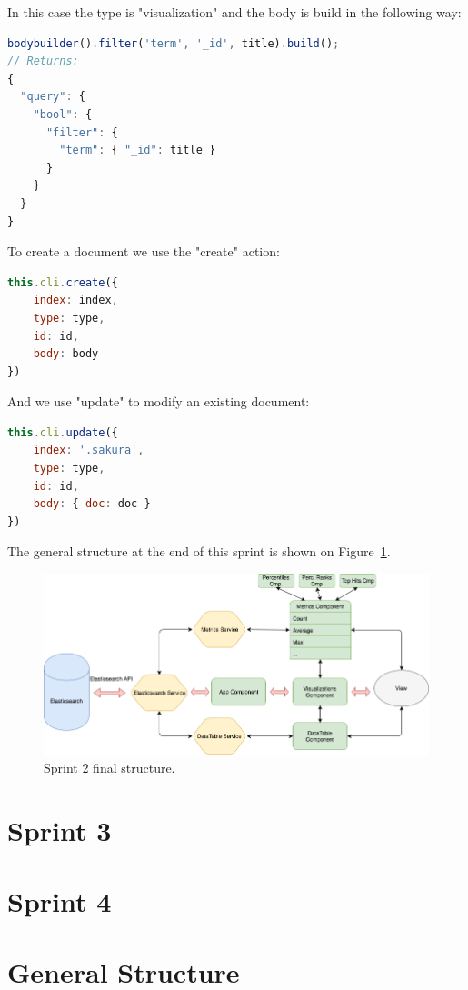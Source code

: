 \documentclass[a4paper, 12pt, english]{book}
\begin{document}
In this case the type is "visualization" and the body is build in the following way:
\begin{lstlisting}[language=javascript]
bodybuilder().filter('term', '_id', title).build();
// Returns:
{
  "query": {
    "bool": {
      "filter": {
        "term": { "_id": title }
      }
    }
  }
}
\end{lstlisting}

To create a document we use the "create" action:
\begin{lstlisting}[language=javascript]
this.cli.create({
	index: index,
	type: type,
	id: id,
	body: body
})
\end{lstlisting}

And we use "update" to modify an existing document:
\begin{lstlisting}[language=javascript]
this.cli.update({
	index: '.sakura',
	type: type,
	id: id,
	body: { doc: doc }
})
\end{lstlisting}

The general structure at the end of this sprint is shown on Figure~\ref{fig:sprint2-architecture-2}.
\begin{figure}
  \centering
  \includegraphics[width=13cm, keepaspectratio]{img/sprint2_architecture_2}
  \caption{Sprint 2 final structure.}
  \label{fig:sprint2-architecture-2}
\end{figure}


\section{Sprint 3}
\label{sec:sprint-3}


\section{Sprint 4}
\label{sec:sprint-4}


\section{General Structure}
\label{sec:general-structure}
\end{document}
